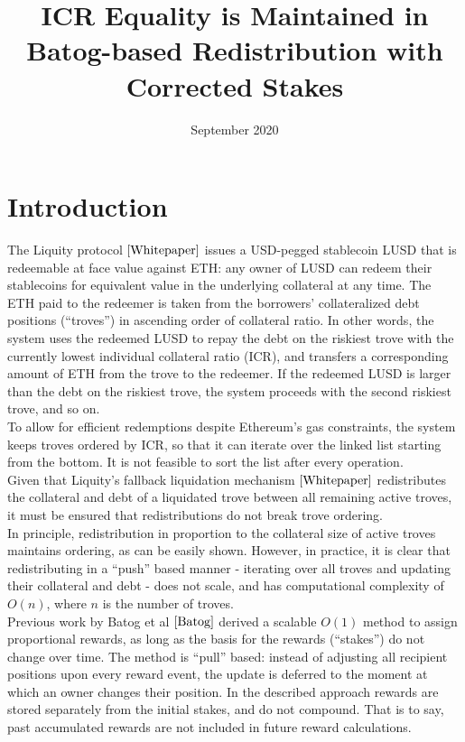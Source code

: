 \documentclass[reqno]{article}
\begin{document}
\title{\textbf{ICR Equality is Maintained in Batog-based Redistribution with Corrected Stakes}}
\date{September 2020}
\maketitle

\tableofcontents

\section{Introduction}


The Liquity protocol $\cite{Whitepaper}$ issues a USD-pegged stablecoin LUSD that is redeemable at face value against ETH: any owner of LUSD can redeem their stablecoins for equivalent value in the underlying collateral at any time. The ETH paid to the redeemer is taken from the borrowers' collateralized debt positions (“troves”) in ascending order of collateral ratio. In other words, the system uses the redeemed LUSD to repay the debt on the riskiest trove with the currently lowest individual collateral ratio (ICR), and transfers a corresponding amount of ETH from the trove to the redeemer. If the redeemed LUSD is larger than the debt on the riskiest trove, the system proceeds with the second riskiest trove, and so on. \\

To allow for efficient redemptions despite Ethereum's gas constraints, the system keeps troves ordered by ICR, so that it can iterate over the linked list starting from the bottom. It is not feasible to sort the list after every operation. \\

Given that Liquity's fallback liquidation mechanism $\cite{Whitepaper}$ redistributes the collateral and debt of a liquidated trove between all remaining active troves, it must be  ensured that redistributions do not break trove ordering. \\

In principle, redistribution in proportion to the collateral size of active troves maintains ordering, as can be easily shown. However, in practice, it is clear that redistributing in a “push” based manner - iterating over all troves and updating their collateral and debt - does not scale, and has computational complexity of $O(n)$, where $n$ is the number of troves. \\

Previous work by Batog et al $\cite{Batog}$ derived a scalable $O(1)$ method to assign proportional rewards, as long as the basis for the rewards (“stakes”) do not change over time. The method is “pull” based: instead of adjusting all recipient positions upon every reward event, the update is deferred to the moment at which an owner changes their position. In the described approach rewards are stored separately from the initial stakes, and do not compound. That is to say, past accumulated rewards are not included in future reward calculations. \\
\end{document}
